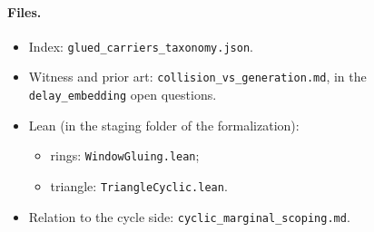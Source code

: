 \documentclass[11pt]{article}
\theoremstyle{plain}
\theoremstyle{definition}
\begin{document}
\paragraph{Files.}
\begin{itemize}[nosep]
  \item Index: \texttt{glued\_carriers\_taxonomy.json}.
  \item Witness and prior art: \texttt{collision\_vs\_generation.md}, in the
    \texttt{delay\_embedding} open questions.
  \item Lean (in the staging folder of the formalization):
    \begin{itemize}[nosep]
      \item rings: \texttt{WindowGluing.lean};
      \item triangle: \texttt{TriangleCyclic.lean}.
    \end{itemize}
  \item Relation to the cycle side:
    \texttt{cyclic\_marginal\_scoping.md}.
\end{itemize}
\end{document}
